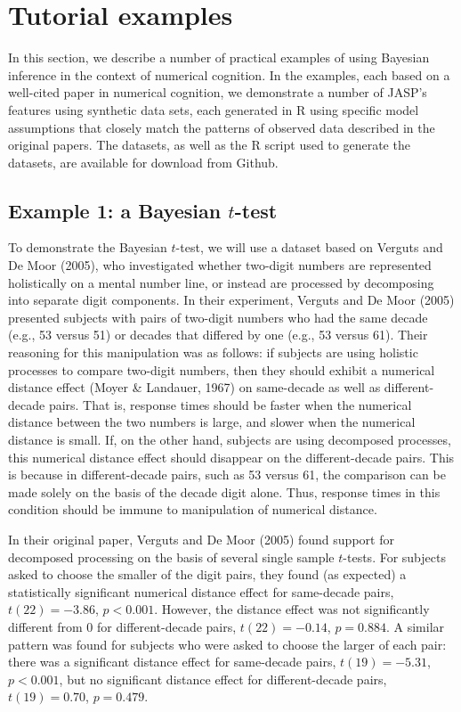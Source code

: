 \documentclass[english,,doc,floatsintext]{apa6}
\begin{document}
\hypertarget{tutorial-examples}{%
\section{Tutorial examples}\label{tutorial-examples}}

In this section, we describe a number of practical examples of using Bayesian inference in the context of numerical cognition. In the examples, each based on a well-cited paper in numerical cognition, we demonstrate a number of JASP's features using synthetic data sets, each generated in R using specific model assumptions that closely match the patterns of observed data described in the original papers. The datasets, as well as the R script used to generate the datasets, are available for download from Github.

\hypertarget{example-1-a-bayesian-t-test}{%
\subsection{\texorpdfstring{Example 1: a Bayesian \(t\)-test}{Example 1: a Bayesian t-test}}\label{example-1-a-bayesian-t-test}}

To demonstrate the Bayesian \(t\)-test, we will use a dataset based on Verguts and De Moor (2005), who investigated whether two-digit numbers are represented holistically on a mental number line, or instead are processed by decomposing into separate digit components. In their experiment, Verguts and De Moor (2005) presented subjects with pairs of two-digit numbers who had the same decade (e.g., 53 versus 51) or decades that differed by one (e.g., 53 versus 61). Their reasoning for this manipulation was as follows: if subjects are using holistic processes to compare two-digit numbers, then they should exhibit a numerical distance effect (Moyer \& Landauer, 1967) on same-decade as well as different-decade pairs. That is, response times should be faster when the numerical distance between the two numbers is large, and slower when the numerical distance is small. If, on the other hand, subjects are using decomposed processes, this numerical distance effect should disappear on the different-decade pairs. This is because in different-decade pairs, such as 53 versus 61, the comparison can be made solely on the basis of the decade digit alone. Thus, response times in this condition should be immune to manipulation of numerical distance.

In their original paper, Verguts and De Moor (2005) found support for decomposed processing on the basis of several single sample \(t\)-tests. For subjects asked to choose the smaller of the digit pairs, they found (as expected) a statistically significant numerical distance effect for same-decade pairs, \(t(22) = -3.86\), \(p<0.001\). However, the distance effect was not significantly different from 0 for different-decade pairs, \(t(22)=-0.14\), \(p=0.884\). A similar pattern was found for subjects who were asked to choose the larger of each pair: there was a significant distance effect for same-decade pairs, \(t(19)=-5.31\), \(p<0.001\), but no significant distance effect for different-decade pairs, \(t(19)=0.70\), \(p=0.479\).
\end{document}
